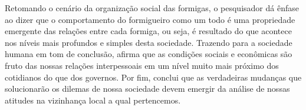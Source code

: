 \documentclass{homework}
\begin{document}
    Retomando o cenário da organização social das formigas, o pesquisador dá ênfase ao dizer que o comportamento do formigueiro como um todo é uma propriedade emergente das relações entre cada formiga, ou seja, é resultado do que acontece nos níveis mais profundos e simples desta sociedade. Trazendo para a sociedade humana em tom de conclusão, afirma que as condições sociais e econômicas são fruto das nossas relações interpessoais em um nível muito mais próximo dos cotidianos do que dos governos. Por fim, conclui que as verdadeiras mudanças que solucionarão os dilemas de nossa sociedade devem emergir da análise de nossas atitudes na vizinhança local a qual pertencemos.\par
    
    
    
    
\end{document}
